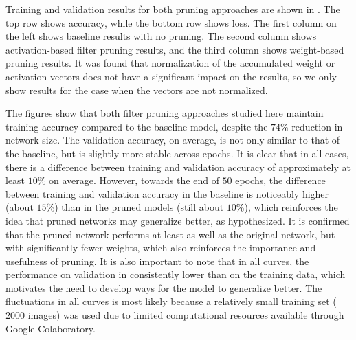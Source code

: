 \documentclass{article}
\begin{document}
Training and validation results for both pruning approaches are shown in . The top row shows accuracy, while the bottom row shows loss. The first column on the left shows baseline results with no pruning. The second column shows activation-based filter pruning results, and the third column shows weight-based pruning results. It was found that normalization of the accumulated weight or activation vectors does not have a significant impact on the results, so we only show results for the case when the vectors are not normalized.

The figures show that both filter pruning approaches studied here maintain training accuracy compared to the baseline model, despite the $74$\% reduction in network size. The validation accuracy, on average, is not only similar to that of the baseline, but is slightly more stable across epochs. It is clear that in all cases, there is a difference between training and validation accuracy of approximately at least $10$\% on average. However, towards the end of $50$ epochs, the difference between training and validation accuracy in the baseline is noticeably higher (about $15$\%) than in the pruned models (still about $10$\%), which reinforces the idea that pruned networks may generalize better, as hypothesized. It is confirmed that the pruned network performs at least as well as the original network, but with significantly fewer weights, which also reinforces the importance and usefulness of pruning. It is also important to note that in all curves, the performance on validation in consistently lower than on the training data, which motivates the need to develop ways for the model to generalize better. The fluctuations in all curves is most likely because a relatively small training set ($2000$ images) was used due to limited computational resources available through Google Colaboratory.
%
\end{document}
